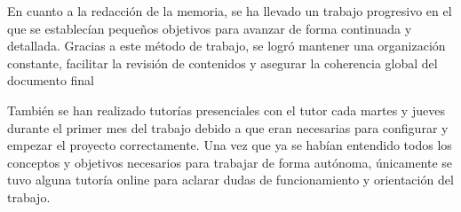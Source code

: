 En cuanto a la redacción de la memoria, se ha llevado un trabajo progresivo en el que se establecían pequeños objetivos para avanzar de forma continuada y detallada. Gracias a este método de trabajo, se logró mantener una organización constante, facilitar la revisión de contenidos y asegurar la coherencia global del documento final

También se han realizado tutorías presenciales con el tutor cada martes y jueves durante el primer mes del trabajo debido a que eran necesarias para configurar y empezar el proyecto correctamente. Una vez que ya se habían entendido todos los conceptos y objetivos necesarios para trabajar de forma autónoma, únicamente se tuvo alguna tutoría online para aclarar dudas de funcionamiento y orientación del trabajo.

